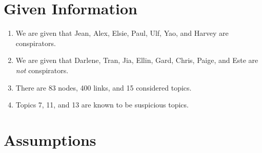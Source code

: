 \documentclass{icmmcm}
\begin{document}
\section{Given Information}
\begin{enumerate}
\item We are given that Jean, Alex, Elsie, Paul, Ulf, Yao,
and Harvey are conspirators.
\item We are given that Darlene, Tran, Jia, Ellin, Gard, Chris,
Paige, and Este are \textit{not} conspirators.
\item There are 83 nodes, 400 links, and 15 considered topics.
\item Topics 7, 11, and 13 are known to be suspicious topics.
\end{enumerate}

\section{Assumptions}
\end{document}
